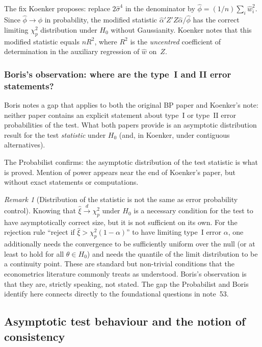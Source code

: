 \documentclass[a4paper,oneside,12pt]{extarticle}
\theoremstyle{plain}
\theoremstyle{definition}
\theoremstyle{remark}
\newtheorem{remark}[proposition]{Remark}
\begin{document}
The fix Koenker proposes: replace $2\hat\sigma^4$ in the denominator
by $\hat\phi = (1/n)\sum_i \hat{w}_i^2$.  Since $\hat\phi \to \phi$
in probability, the modified statistic $\hat\alpha'Z'Z\hat\alpha /
\hat\phi$ has the correct limiting $\chi^2_p$ distribution under $H_0$
without Gaussianity.  Koenker notes that this modified statistic
equals $nR^2$, where $R^2$ is the \emph{uncentred} coefficient of
determination in the auxiliary regression of $\hat{w}$ on~$Z$.

\subsubsection*{Boris's observation: where are the type~I and II error statements?}

Boris notes a gap that applies to both the original BP paper and
Koenker's note: neither paper contains an explicit statement about
type~I or type~II error probabilities of the test.  What both papers
provide is an asymptotic distribution result for the test
\emph{statistic} under $H_0$ (and, in Koenker, under contiguous
alternatives).

The Probabilist confirms: the asymptotic distribution of the test statistic is
what is proved.  Mention of power appears near the end of Koenker's
paper, but without exact statements or computations.

\begin{remark}[Distribution of the statistic is not the same as error probability control]
Knowing that $\hat\xi \xrightarrow{d} \chi^2_p$ under $H_0$ is a
necessary condition for the test to have asymptotically correct size,
but it is not sufficient on its own.  For the rejection rule
``reject if $\hat\xi > \chi^2_p(1-\alpha)$'' to have limiting type~I
error $\alpha$, one additionally needs the convergence to be
sufficiently uniform over the null (or at least to hold for all
$\theta \in H_0$) and needs the quantile of the limit distribution to
be a continuity point.  These are standard but non-trivial conditions
that the econometrics literature commonly treats as understood.
Boris's observation is that they are, strictly speaking, not stated.
The gap the Probabilist and Boris identify here connects directly to the
foundational questions in note~53.
\end{remark}


\subsection{Asymptotic test behaviour and the notion of consistency}
\label{subsec:asymp-test}
\end{document}
